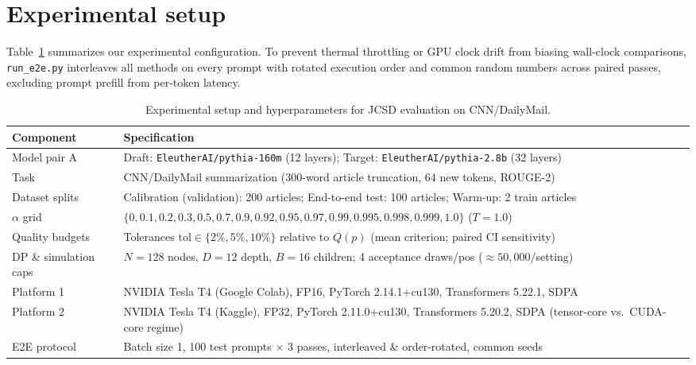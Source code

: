 \documentclass[10pt]{article}
\begin{document}
\section{Experimental setup}

Table~\ref{tab:setup} summarizes our experimental configuration. To prevent thermal throttling or GPU clock drift from biasing wall-clock comparisons, \texttt{run\_e2e.py} interleaves all methods on every prompt with rotated execution order and common random numbers across paired passes, excluding prompt prefill from per-token latency.

\begin{table}[h]
  \caption{Experimental setup and hyperparameters for JCSD evaluation on CNN/DailyMail.}
  \label{tab:setup}
  \centering
  \small
  \begin{tabularx}{\linewidth}{@{}lX@{}}
    \toprule
    Component & Specification \\
    \midrule
    Model pair A & Draft: \texttt{EleutherAI/pythia-160m} (12 layers); Target: \texttt{EleutherAI/pythia-2.8b} (32 layers) \\
    Task & CNN/DailyMail summarization (300-word article truncation, 64 new tokens, ROUGE-2) \\
    Dataset splits & Calibration (validation): 200 articles; End-to-end test: 100 articles; Warm-up: 2 train articles \\
    $\alpha$ grid & $\{0, 0.1, 0.2, 0.3, 0.5, 0.7, 0.9, 0.92, 0.95, 0.97, 0.99, 0.995, 0.998, 0.999, 1.0\}$ ($T = 1.0$) \\
    Quality budgets & Tolerances $\mathrm{tol} \in \{2\%, 5\%, 10\%\}$ relative to $Q(p)$ (mean criterion; paired CI sensitivity) \\
    DP \& simulation caps & $N = 128$ nodes, $D = 12$ depth, $B = 16$ children; 4 acceptance draws/pos ($\approx 50{,}000$/setting) \\
    Platform 1 & NVIDIA Tesla T4 (Google Colab), FP16, PyTorch 2.14.1+cu130, Transformers 5.22.1, SDPA \\
    Platform 2 & NVIDIA Tesla T4 (Kaggle), FP32, PyTorch 2.11.0+cu130, Transformers 5.20.2, SDPA (tensor-core vs.\ CUDA-core regime) \\
    E2E protocol & Batch size 1, 100 test prompts $\times$ 3 passes, interleaved \& order-rotated, common seeds \\
    \bottomrule
  \end{tabularx}
  \vspace{11pt}
\end{table}
\end{document}
